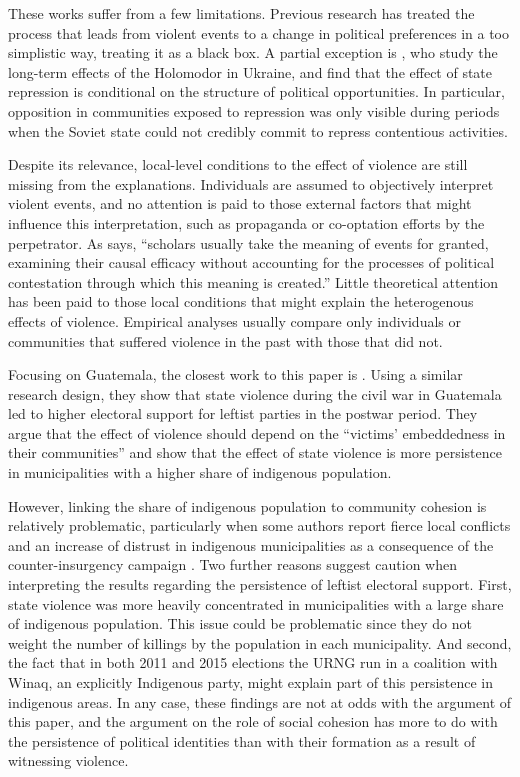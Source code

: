 \documentclass[12pt, notitlepage]{article}
\begin{document}
These works suffer from a few limitations.
Previous research has treated the process that leads from violent events to a change in political preferences in a too simplistic way, treating it as a black box.
A partial exception is \citet{Rozenas:2019aa}, who study the long-term effects of the Holomodor in Ukraine, and find that the effect of state repression is conditional on the structure of political opportunities.
In particular, opposition in communities exposed to repression was only visible during periods when the Soviet state could not credibly commit to repress contentious activities.

Despite its relevance, local-level conditions to the effect of violence are still missing from the explanations.
Individuals are assumed to objectively interpret violent events, and no attention is paid to those external factors that might influence this interpretation, such as propaganda or co-optation efforts by the perpetrator.
As \citet[1244]{Basta:2018aa} says, ``scholars usually take the meaning of events for granted, examining their causal efficacy without accounting for the processes of political contestation through which this meaning is created.''
Little theoretical attention has been paid to those local conditions that might explain the heterogenous effects of violence.
Empirical analyses usually compare only individuals or communities that suffered violence in the past with those that did not.

Focusing on Guatemala, the closest work to this paper is \citet{Vogt:2019aa}.
Using a similar research design, they show that state violence during the civil war in Guatemala led to higher electoral support for leftist parties in the postwar period.
They argue that the effect of violence should depend on the ``victims' embeddedness in their communities'' and show that the effect of state violence is more persistence in municipalities with a higher share of indigenous population.

However, linking the share of indigenous population to community cohesion is relatively problematic, particularly when some authors report fierce local conflicts and an increase of distrust in indigenous municipalities as a consequence of the counter-insurgency campaign \citep[e.g.][]{Burrell:2013aa}.
Two further reasons suggest caution when interpreting the results regarding the persistence of leftist electoral support.
First, state violence was more heavily concentrated in municipalities with a large share of indigenous population.
This issue could be problematic since they do not weight the number of killings by the population in each municipality.
And second, the fact that in both 2011 and 2015 elections the URNG run in a coalition with Winaq, an explicitly Indigenous party, might explain part of this persistence in indigenous areas.
In any case, these findings are not at odds with the argument of this paper, and the argument on the role of social cohesion has more to do with the persistence of political identities than with their formation as a result of witnessing violence.
\end{document}
